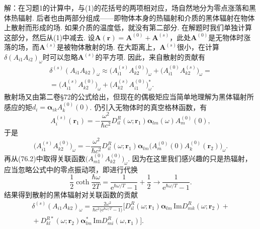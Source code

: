 \begin{xiti}
{\heiti 解：}在习题1的计算中，与(1)的花括号的两项相对应，场自然地分为零点涨落和黑体热辐射. 后者也由两部分组成——即物体本身的热辐射和介质的黑体辐射在物体上散射而形成的场. 如果介质的温度低，就没有第二部分. 在解题时我们单独计算这部分，然后从(1)中减去. 设$\bm{A}(\bm{r})=\bm{A}^{(0)}+\bm{A}^{(s)}$，此处$\bm{A}^{(0)}$是无物体时涨落的场，而$\bm{A}^{(s)}$是被物体散射的场. 在大距离上，$\bm{A}^{(s)}$很小，在计算$\delta(A_{i1}A_{i2})_{\omega}$时可以忽略$\bm{A}^{(s)}$的平方项. 因此，来自散射的贡献有
\begin{equation*}
\begin{aligned}
\delta^{(s)}(A_{i1}A_{k2})_{\omega}\approx\bigl(A_{i1}^{(s)}A_{k2}^{(0)}\bigr)_{\omega}+\bigl(A_{i1}^{(0)}A_{k2}^{(s)}\bigr)_{\omega}=\\
{}=\bigl(A_{i1}^{(s)}A_{k2}^{(0)}\bigr)_{\omega}+\bigl(A_{k2}^{(s)}A_{i1}^{(0)}\bigr)_{\omega}^{*}.
\end{aligned}
\end{equation*}
散射场又由第二卷§72的公式给出，但现在的偶极矩应当简单地理解为黑体辐射所感应的矩$d_{i}=\bm{\alpha}_{ik}A_{k}^{(0)}(0)$. 仍引入无物体时的真空格林函数，有
\begin{equation*}
A_{i}^{(s)}(\bm{r}_{1})=-\frac{\omega^{2}}{\hbar c^{2}}D_{il}^{R}(\omega;\bm{r}_{1})\bm{\alpha}_{lm}(\omega)A_{m}^{(0)}(0),
\end{equation*}
于是
\begin{equation*}
\bigl(A_{i1}^{(s)}A_{k2}^{(0)}\bigr)_{\omega}=-\frac{\omega^{2}}{\hbar c^{2}}D_{il}^{R}(\omega;\bm{r}_{1})\bm{\alpha}_{lm}\bigl(A_{m}^{(0)}(0)A_{k}^{(0)}(\bm{r}_{2})\bigr)_{\omega}.
\end{equation*}
再从(76.2)中取得关联函数$\bigl(A_{m1}^{(0)}A_{k2}^{(0)}\bigr)_{\omega}$. 因为在这里我们感兴趣的只是热辐射，应当忽略公式中的零点振动项，即进行代换
\begin{equation*}
\frac{1}{2}\coth\frac{\hbar\omega}{2T}=\frac{1}{\mathrm{e}^{\hbar\omega/T}-1}+\frac{1}{2}\longrightarrow\frac{1}{\mathrm{e}^{\hbar\omega/T}-1}.
\end{equation*}
结果得到散射的黑体辐射对关联函数的贡献
\begin{equation}\tag{3}
\begin{aligned}
\delta^{(s)}(A_{i1}A_{k2})_{\omega}=\frac{2\omega^{2}}{\hbar c^{2}\bigl(\mathrm{e}^{\hbar\omega/T}-1\bigr)}
\bigl[D_{il}^{R}(\omega;\bm{r}_{1})\bm{\alpha}_{lm}\,\mathrm{Im}D_{mk}^{R}(\omega;\bm{r}_{2})+{}\\
{}+D_{kl}^{R*}(\omega;\bm{r}_{2})\bm{\alpha}_{lm}^{*}\,\mathrm{Im}D_{mi}^{R}(\omega,\bm{r}_{1})\bigr].

\end{aligned}
\end{equation}
\end{xiti}
